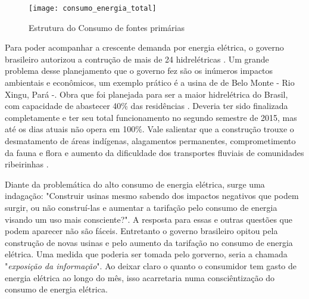 \begin{figure}[h!]
	\texttt{[image: consumo\_energia\_total]}
	\centering
	\caption[Estrutura do Consumo de fontes primárias]{Estrutura do Consumo de fontes primárias}
	\label{fig:consumo_energia_total}
\end{figure}
\FloatBarrier

Para poder acompanhar a crescente demanda por energia elétrica, o governo brasileiro autorizou a contrução de mais de 24 hidrelétricas \cite{governo-preve}.
Um grande problema desse planejamento que o governo fez são os inúmeros impactos ambientais e econômicos, um exemplo prático é a usina de de Belo Monte - Rio Xingu, Pará -. Obra que foi planejada
para ser a maior hidrelétrica do Brasil, com capacidade de abastecer 40\% das residências \cite{energia-abastece}.
Deveria ter sido finalizada completamente e ter seu total funcionamento no segundo semestre de 2015, mas até os dias atuais não opera em 100\%. Vale salientar que a construção
trouxe o desmatamento de áreas indígenas, alagamentos permanentes, comprometimento da fauna e flora e aumento da dificuldade dos transportes fluviais
de comunidades ribeirinhas \cite{ref-g1}.

Diante da problemática do alto consumo de energia elétrica, surge uma indagação: "Construir usinas mesmo sabendo dos impactos negativos que podem surgir, ou não construí-las e
aumentar a tarifação pelo consumo de energia visando um uso mais consciente?". A resposta para essas e outras questões que podem aparecer não são fáceis.
Entretanto o governo brasileiro opitou pela construção de novas usinas e pelo aumento da tarifação no consumo de energia elétrica. 
Uma medida que poderia ser tomada pelo gorverno, seria a chamada "\textit{exposição da informação}". Ao deixar claro 
o quanto o consumidor tem gasto de energia elétrica ao longo do mês, isso acarretaria numa consciêntização do consumo de energia elétrica.



